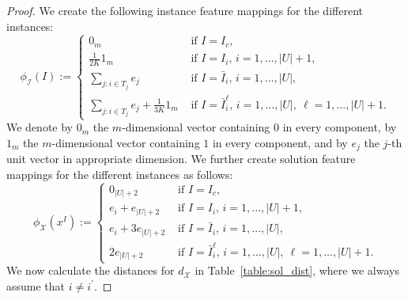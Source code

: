 \documentclass[11pt, a4paper]{article}
\newcommand{\FRil}[1]{\todo[color=black, textcolor=white, inline, author=FR]{#1}}
\newcommand{\I}{{\mathcal{I}}} %
\newcommand{\X}{{\mathcal{X}}} %
\newcommand{\instance}{I}
\newcommand{\solution}{x}
\newcommand{\instanceindex}{i}
\newcommand{\instanceindextwo}{j}
\newcommand{\instfeaturemap}[1][(\instance^\instanceindex)]{\phi_\I#1} %
\newcommand{\solfeaturemap}[1][(\instance^\instanceindex,\solution^\instanceindex)]{\phi_\X#1} %
\newcommand{\soldist}[1][(\instanceindex,\instanceindextwo)]{d_\X#1} %
\begin{document}
\begin{proof}
We create the following instance feature mappings for the different instances:
\begin{equation}
\instfeaturemap[(I)] := \begin{cases}
0_{m} &\text{ if }I = I_c,\\
\frac{1}{2K}1_m &\text{ if }I = I_i\text{, }i = 1,...,|U|+1,\\
\sum_{j: i \in T_j} e_j &\text{ if }I = \bar{I}_i\text{, }i=1,...,|U|,\\
\sum_{j: i \in T_j} e_j+\frac{1}{3K}1_m &\text{ if }I = \bar{I}^\ell_i\text{, }i=1,...,|U|,~\ell=1,...,|U|+1.
\end{cases}
\end{equation}
We denote by $0_m$ the $m$-dimensional vector containing $0$ in every
component, by $1_m$ the $m$-dimensional vector containing $1$ in every
component, and by $e_j$ the $j$-th unit vector in appropriate dimension.
We further create solution feature mappings for the different
instances as follows:
\begin{equation}
\solfeaturemap[(\solution^I)] := \begin{cases}
0_{|U|+2} &\text{ if }I = I_c,\\
e_i + e_{|U|+2} &\text{ if }I = I_i\text{, }i = 1,...,|U|+1,\\
e_i + 3e_{|U|+2} &\text{ if }I = \bar{I}_i\text{, }i=1,...,|U|,\\
2 e_{|U|+2} &\text{ if }I = \bar{I}^\ell_i\text{, }i=1,...,|U|,~\ell=1,...,|U|+1.
\end{cases}
\end{equation}
We now calculate the distances for $\soldist[]$ in Table~\ref{table:sol_dist}, where we always assume that $i\neq i^\prime$.


\end{proof}
\end{document}
